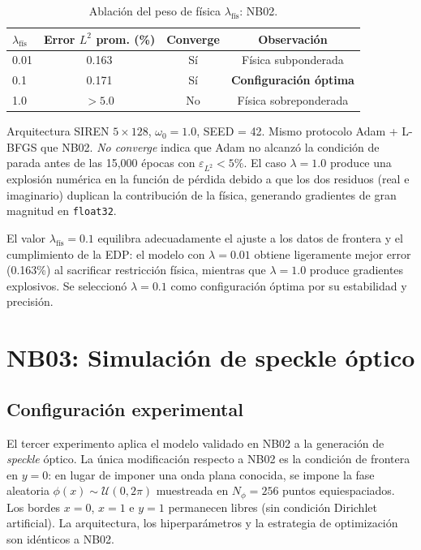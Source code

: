 \begin{table}[htbp]
\centering
\begin{threeparttable}
\caption{Ablación del peso de física $\lambda_\text{fís}$: NB02.}
\label{tab:ablacion_lambda}
\begin{tabular}{lccc}
\toprule
$\lambda_\text{fís}$ & Error $L^2$ prom. (\%) & Converge & Observación \\
\midrule
0.01  & 0.163  & Sí & Física subponderada \\
0.1   & 0.171  & Sí & \textbf{Configuración óptima} \\
1.0   & $>5.0$ & No & Física sobreponderada \\
\bottomrule
\end{tabular}
\begin{tablenotes}\small
    \item Arquitectura SIREN $5 \times 128$, $\omega_0 = 1.0$, SEED = 42.
    Mismo protocolo Adam + L-BFGS que NB02.
    \textit{No converge} indica que Adam no alcanzó la condición de parada
    antes de las 15{,}000 épocas con $\varepsilon_{L^2} < 5\%$. El caso
    $\lambda = 1.0$ produce una explosión numérica en la función de pérdida
    debido a que los dos residuos (real e imaginario) duplican la contribución
    de la física, generando gradientes de gran magnitud en \texttt{float32}.
\end{tablenotes}
\end{threeparttable}
\end{table}

El valor $\lambda_\text{fís} = 0.1$ equilibra adecuadamente el ajuste a los
datos de frontera y el cumplimiento de la EDP: el modelo con $\lambda = 0.01$
obtiene ligeramente mejor error (0.163\%) al sacrificar restricción física,
mientras que $\lambda = 1.0$ produce gradientes explosivos. Se seleccionó
$\lambda = 0.1$ como configuración óptima por su estabilidad y precisión.

\section{NB03: Simulación de speckle óptico}
\label{sec:resultados_speckle}

\subsection{Configuración experimental}

El tercer experimento aplica el modelo validado en NB02 a la generación de
\textit{speckle} óptico. La única modificación respecto a NB02 es la condición
de frontera en $y = 0$: en lugar de imponer una onda plana conocida, se impone
la fase aleatoria $\phi(x) \sim \mathcal{U}(0, 2\pi)$ muestreada en
$N_\phi = 256$ puntos equiespaciados. Los bordes $x = 0$, $x = 1$ e $y = 1$
permanecen libres (sin condición Dirichlet artificial). La arquitectura, los
hiperparámetros y la estrategia de optimización son idénticos a NB02.

